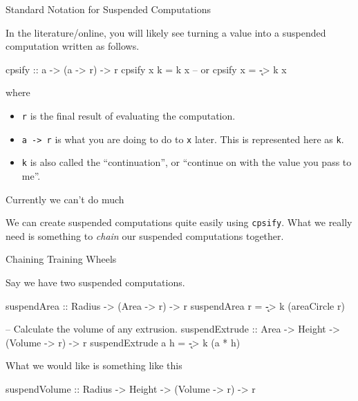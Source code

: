 \documentclass[ignorenonframetext,]{beamer}
\begin{document}
\begin{frame}[fragile]{Standard Notation for Suspended Computations}

In the literature/online, you will likely see turning a value into a
suspended computation written as follows.

\begin{haskellcode}
cpsify :: a -> (a -> r) -> r
cpsify x k = k x
-- or cpsify x = \k -> k x
\end{haskellcode}

where

\begin{itemize}
\itemsep1pt\parskip0pt
\item
  \texttt{r} is the final result of evaluating the computation.
\item
  \texttt{a -\textgreater{} r} is what you are doing to do to \texttt{x}
  later. This is represented here as \texttt{k}.
\item
  \texttt{k} is also called the ``continuation'', or ``continue on with
  the value you pass to me''.
\end{itemize}

\end{frame}

\begin{frame}{Currently we can't do much}

We can create suspended computations quite easily using \texttt{cpsify}.
What we really need is something to \emph{chain} our suspended
computations together.

\end{frame}

\begin{frame}[fragile]{Chaining Training Wheels}

Say we have two suspended computations.

\begin{haskellcode}
suspendArea :: Radius -> (Area -> r) -> r
suspendArea r = \k -> k (areaCircle r)

-- Calculate the volume of any extrusion.
suspendExtrude :: Area -> Height -> (Volume -> r) -> r
suspendExtrude a h = \k -> k (a * h)
\end{haskellcode}

\pause

What we would like is something like this

\begin{haskellcode}
suspendVolume :: Radius -> Height -> (Volume -> r) -> r
\end{haskellcode}

\end{frame}
\end{document}
